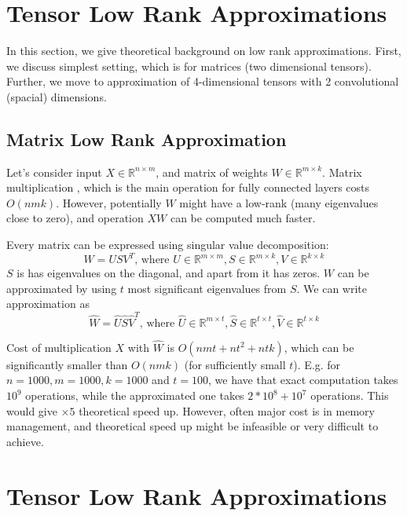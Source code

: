 \documentclass{article}
\begin{document}
\section{Tensor Low Rank Approximations}
In this section, we give theoretical background on low rank approximations. First, we discuss simplest setting, which is
for matrices (two dimensional tensors). Further, we move to approximation of 4-dimensional tensors with 2 convolutional (spacial)
dimensions.


\subsection{Matrix Low Rank Approximation}
Let's consider input $X \in \mathbb{R}^{n \times m}$, and matrix of weights $W \in \mathbb{R}^{m \times k}$. Matrix multiplication
, which is the main operation for fully connected layers costs $O(nmk)$. However, potentially $W$ might have a low-rank (many 
eigenvalues close to zero), and operation $XW$ can be computed much faster. 


Every matrix can be expressed using singular value decomposition:
\begin{equation*}
	W = USV^T\text{, where }U \in \mathbb{R}^{m \times m}, S \in \mathbb{R}^{m \times k}, V \in \mathbb{R}^{k \times k}
\end{equation*}
$S$ is has eigenvalues on the diagonal, and apart from it has zeros. $W$ can be approximated by using $t$ most significant
eigenvalues from $S$. We can write approximation as
\begin{equation*}
	\hat{W} = \hat{U}\hat{S}\hat{V}^T\text{, where }\hat{U} \in \mathbb{R}^{m \times t}, \hat{S} \in \mathbb{R}^{t \times t}, \hat{V} \in \mathbb{R}^{t \times k}
\end{equation*}

Cost of multiplication $X$ with $\hat{W}$ is $O(nmt + nt^2 + ntk)$, which can be significantly smaller than $O(nmk)$ (for sufficiently small $t$). E.g.
for $n = 1000, m = 1000, k = 1000$ and $t = 100$, we have that exact computation takes $10^9$ operations, while the approximated one takes
$2 * 10^8 + 10^7$ operations. This would give $\times 5$ theoretical speed up. However, often major cost is in memory management, 
and theoretical speed up might be infeasible or very difficult to achieve. 


\section{Tensor Low Rank Approximations}
\end{document}
